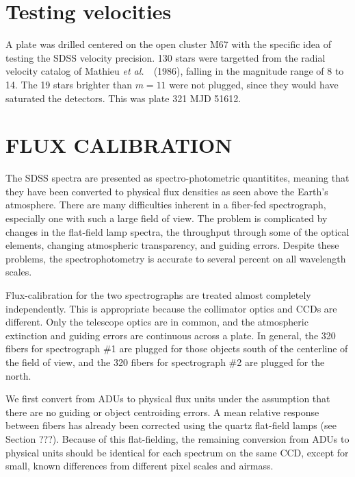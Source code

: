 \documentclass[12pt,preprint]{aastex}
\newcommand{\etal}{{\it et al.}~}
\newcommand{\ergs}{{\rm ~erg~s}^{-1}}
\newcommand{\ergscmang}{{\rm ~erg~s}^{-1}{\rm cm}^{-2}{\rm\AA}^{-1}}
\begin{document}
\section{Testing velocities}


A plate was drilled centered on the open cluster M67 with the
specific idea of testing the SDSS velocity precision.
130 stars were targetted from the radial velocity catalog
of Mathieu \etal\ (1986), falling in the magnitude range of 8 to 14.
The 19 stars brighter than $m=11$ were not plugged, since they
would have saturated the detectors.  This was plate 321 MJD 51612.

\section{FLUX CALIBRATION}
\label{sec_fluxing}

The SDSS spectra are presented as spectro-photometric quantitites,
meaning that they have been converted to physical flux densities
as seen above the Earth's atmosphere.
There are many difficulties inherent in a fiber-fed spectrograph,
especially one with such a large field of view.
The problem is complicated by changes in the flat-field lamp spectra,
the throughput through some of the optical elements, changing
atmospheric transparency, and guiding errors.
Despite these problems, the spectrophotometry is accurate to
several percent on all wavelength scales.

Flux-calibration for the two spectrographs are treated almost completely
independently.  This is appropriate because the collimator optics
and CCDs are different.  Only the telescope optics are in common, and the
atmospheric extinction and guiding errors are continuous across a plate.
In general, the 320 fibers for spectrograph \#1 are plugged for those
objects south of the centerline of the field of view, and the 320 fibers
for spectrograph \#2 are plugged for the north.


We first convert from ADUs to physical flux units under the
assumption that there are no guiding or object centroiding errors.
A mean relative response between fibers has already been corrected
using the quartz flat-field lamps (see Section ???).
Because of this flat-fielding, the remaining conversion from ADUs
to physical units should be identical for each spectrum on the 
same CCD, except for small, known differences from different pixel scales
and airmass.
\end{document}
